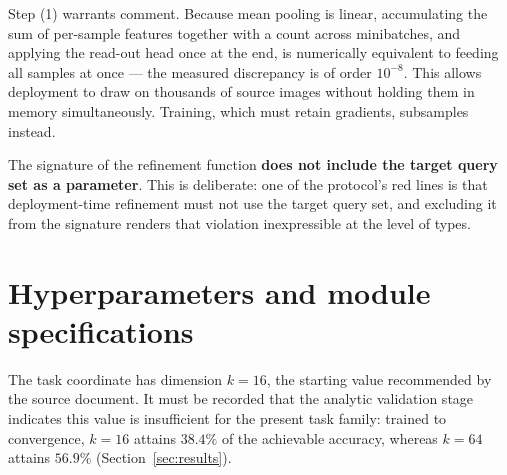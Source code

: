 \documentclass[11pt]{article}
\begin{document}
Step (1) warrants comment. Because mean pooling is linear, accumulating the sum of per-sample
features together with a count across minibatches, and applying the read-out head once at the end,
is numerically equivalent to feeding all samples at once --- the measured discrepancy is of order
$10^{-8}$. This allows deployment to draw on thousands of source images without holding them in
memory simultaneously. Training, which must retain gradients, subsamples instead.

The signature of the refinement function \textbf{does not include the target query set as a
parameter}. This is deliberate: one of the protocol's red lines is that deployment-time refinement
must not use the target query set, and excluding it from the signature renders that violation
inexpressible at the level of types.

\section{Hyperparameters and module specifications}
\label{sec:hp}

The task coordinate has dimension $k=16$, the starting value recommended by the source document. It
must be recorded that the analytic validation stage indicates this value is insufficient for the
present task family: trained to convergence, $k=16$ attains $38.4\%$ of the achievable accuracy,
whereas $k=64$ attains $56.9\%$ (Section~\ref{sec:results}).
\end{document}
